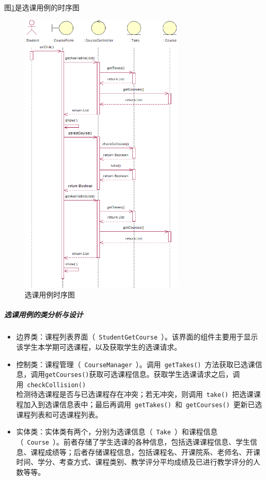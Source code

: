 图\ref{fig:selectcourse_secquence}是选课用例的时序图
\begin{figure}[htbp]
  \centering
  \includegraphics[width=0.7\textwidth]{img/selectcourse_secquence}
  \caption{选课用例时序图}
  \label{fig:selectcourse_secquence}
\end{figure}
    
\subparagraph{选课用例的类分析与设计}
\begin{itemize}
  \item 边界类：课程列表界面（~\texttt{StudentGetCourse}~）。该界面的组件主要用于显示该学生本学期可选课程，以及获取学生的选课请求。

  \item 控制类：课程管理（~\texttt{CourseManager}~）。调用~\texttt{getTakes()}~方法获取已选课信息，调用\texttt{getCourses()}获取可选课程信息。获取学生选课请求之后，调用~\texttt{checkCollision()}~\\检测待选课程是否与已选课程存在冲突；若无冲突，则调用~\texttt{take()}~把选课课程加入到选课信息表中；最后再调用~\texttt{getTakes()}~和~\texttt{getCourses()}~更新已选课程列表和可选课程列表。

  \item 实体类：实体类有两个，分别为选课信息（~\texttt{Take}~）和课程信息（~\texttt{Course}~）。前者存储了学生选课的各种信息，包括选课课程信息、学生信息、课程成绩等；后者存储课程信息，包括课程名、开课院系、老师名、开课时间、学分、考查方式、课程类别、教学评分平均成绩及已进行教学评分的人数等等。
\end{itemize}
    
